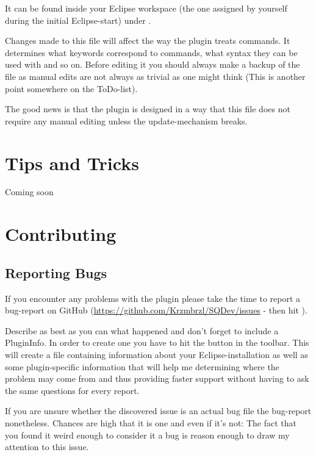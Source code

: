\documentclass[twoside=false]{scrbook}
\newcommand{\eclipse}{Eclipse\xspace}
\newcommand{\button}[1]{\menu{\inlinegraphic{#1}}}
\newlength\myheight
\newlength\mydepth
\newcommand{\inlinegraphic}[1]{%
  \settototalheight\myheight{Xygp}%
  \settodepth\mydepth{Xygp}%
  \raisebox{-\mydepth}{\texttt{[image: \#1]}}%
}
\begin{document}
	It can be found inside your \eclipse workspace (the one assigned by yourself during the initial \eclipse-start) under .
	
	Changes made to this file will affect the way the plugin treats commands. It determines what keywords correspond to commands, what syntax they can be used with and so on. Before editing it you should always make a backup of the file as manual edits are not always as trivial as one might think (This is another point somewhere on the ToDo-list).
	
	The good news is that the plugin is designed in a way that this file does not require any manual editing unless the update-mechanism breaks.
	
	
	
	
	\chapter{Tips and Tricks}
	\label{ch:TipsAndTricks}
	Coming soon
	
	
	
	\chapter{Contributing}
	\label{ch:Contributing}
	
	\section{Reporting Bugs}
	\label{sec:ReportingBugs}
	If you encounter any problems with the plugin please take the time to report a bug-report on GitHub (\url{https://github.com/Krzmbrzl/SQDev/issues} - then hit ).
	
	Describe as best as you can what happened and don't forget to include a PluginInfo. In order to create one you have to hit the \button{images/pluginInfoIcon.png} button in the toolbar. This will create a  file containing information about your \eclipse-installation as well as some plugin-specific information that will help me determining where the problem may come from and thus providing faster support without having to ask the same questions for every report.
	
	If you are unsure whether the discovered issue is an actual bug file the bug-report nonetheless. Chances are high that it is one and even if it's not: The fact that you found it weird enough to consider it a bug is reason enough to draw my attention to this issue.
	
\end{document}

